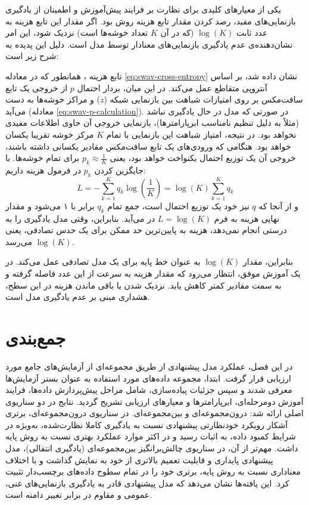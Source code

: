 یکی از معیارهای کلیدی برای نظارت بر فرایند پیش‌آموزش و اطمینان از یادگیری بازنمایی‌های مفید، رصد کردن مقدار تابع هزینه روش  بود. اگر مقدار این تابع هزینه به عدد ثابت
$\log(K)$ (که در آن $K$ تعداد خوشه‌ها است) نزدیک شود، این امر نشان‌دهنده‌ی عدم یادگیری بازنمایی‌های معنادار توسط مدل است. دلیل این پدیده به شرح زیر است:

تابع هزینه ، همانطور که در معادله \ref{eq:swav-cross-entropy} نشان داده شد، بر اساس آنتروپی متقاطع عمل می‌کند. در این میان، بردار احتمال $p$ از خروجی یک تابع سافت‌مکس بر روی امتیازات شباهت بین بازنمایی شبکه ($z$) و مراکز خوشه‌ها به دست می‌آید (معادله \ref{eq:swav-p-calculation}). در صورتی که مدل در حال یادگیری نباشد (مثلاً به دلیل تنظیم نامناسب ابرپارامترها)، بازنمایی خروجی آن حاوی اطلاعات مفیدی نخواهد بود. در نتیجه، امتیاز شباهت این بازنمایی با تمام $K$
مرکز خوشه تقریبا یکسان خواهد بود. هنگامی که ورودی‌های یک تابع سافت‌مکس مقادیر یکسانی داشته باشند، خروجی آن یک توزیع احتمال یکنواخت خواهد بود، یعنی $p_k \approx \frac{1}{K}$ برای تمام خوشه‌ها. با جایگزین کردن $p_k$ در فرمول هزینه داریم:
\begin{equation}
    L = - \sum_{k=1}^{K} q_k \log \left( \frac{1}{K} \right) = \log(K) \sum_{k=1}^{K} q_k
\end{equation}
و از آنجا که $q$ نیز خود یک توزیع احتمال است، جمع تمام $q_k$ برابر با ۱ می‌شود و مقدار نهایی هزینه به فرم $L = \log(K)$ در می‌آید. بنابراین، وقتی مدل یادگیری را به درستی انجام نمی‌دهد، هزینه به پایین‌ترین حد ممکن برای یک حدس تصادفی، یعنی 
$\log(K)$ می‌رسد.

بنابراین، مقدار $\log(K)$ به عنوان خط پایه برای یک مدل تصادفی عمل می‌کند. در یک آموزش موفق، انتظار می‌رود که مقدار هزینه به سرعت از این عدد فاصله گرفته و به سمت مقادیر کمتر کاهش یابد. نزدیک شدن یا باقی ماندن هزینه در این سطح، هشداری مبنی بر عدم یادگیری مدل است.

\section{جمع‌بندی}

در این فصل، عملکرد مدل پیشنهادی از طریق مجموعه‌ای از آزمایش‌های جامع مورد ارزیابی قرار گرفت. ابتدا، مجموعه داده‌های مورد استفاده به عنوان بستر آزمایش‌ها معرفی شدند و سپس جزئیات پیاده‌سازی، شامل مراحل پیش‌پردازش داده‌ها، فرایند آموزش دومرحله‌ای، ابرپارامترها و معیارهای ارزیابی تشریح گردید. نتایج در دو سناریوی اصلی ارائه شد: درون‌مجموعه‌ای و بین‌مجموعه‌ای. در سناریوی درون‌مجموعه‌ای، برتری آشکار رویکرد خودنظارتی پیشنهادی نسبت به یادگیری کاملا نظارت‌شده، به‌ویژه در شرایط کمبود داده، به اثبات رسید و در اکثر موارد عملکرد بهتری نسبت به روش پایه داشت. مهم‌تر از آن، در سناریوی چالش‌برانگیز بین‌مجموعه‌ای (یادگیری انتقالی)، مدل پیشنهادی پایداری و قابلیت تعمیم بالاتری از خود به نمایش گذاشت و با اختلاف معناداری نسبت به روش پایه، برتری خود را در تمام سطوح داده‌های برچسب‌دار تثبیت کرد. این یافته‌ها نشان می‌دهد که مدل پیشنهادی قادر به یادگیری بازنمایی‌های غنی، عمومی و مقاوم در برابر تغییر دامنه است.
